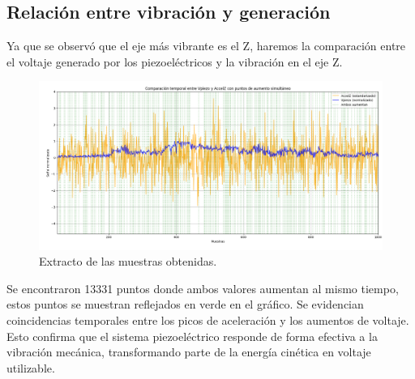 \documentclass{article}
\begin{document}
\subsection{Relación entre vibración y generación}
Ya que se observó que el eje más vibrante es el Z, haremos la comparación entre el voltaje generado por los piezoeléctricos y la vibración en el eje Z.
\begin{figure}[H]
    \centering
    \includegraphics[width=\textwidth]{AccelZxVpiezo.png}
    \caption{Extracto de las muestras obtenidas.}
    \label{fig:my_label}
\end{figure}
Se encontraron 13331 puntos donde ambos valores aumentan al mismo tiempo, estos puntos se muestran reflejados en verde en el gráfico.
Se evidencian coincidencias temporales entre los picos de aceleración y los aumentos de voltaje. Esto confirma que el sistema piezoeléctrico responde de forma efectiva a la vibración mecánica, transformando parte de la energía cinética en voltaje utilizable.
\end{document}
